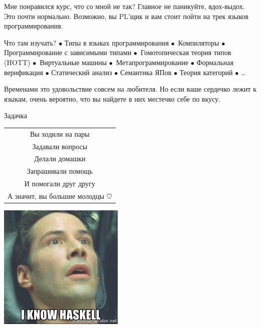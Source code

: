     \begin{frame}{Мне понравился курс, что со мной не так?}
        Главное не паникуйте, вдох-выдох. Это почти нормально. Возможно, вы PL'щик и вам стоит пойти на трек языков программирования.

        \vspace{1em}
        Что там изучать? $\bullet$ Типы в языках программирования $\bullet$~Компиляторы $\bullet$ Программирование с зависимыми типами $\bullet$~Гомотопическая теория типов (HOTT) $\bullet$~Виртуальные машины $\bullet$~Метапрограммирование $\bullet$ Формальная верификация $\bullet$ Статический анализ $\bullet$ Семантика ЯПов $\bullet$ Теория категорий $\bullet$ \ldots

        \vspace{1em}
        Временами это удовольствие совсем на любителя. Но если ваше сердечко лежит к языкам, очень вероятно, что вы найдете в них местечко себе по вкусу.
    \end{frame}

    \begin{frame}[fragile]{Задачка}
        \begin{center}
            \begin{tabular}{c}
                 Вы ходили на пары \\
                 Задавали вопросы \\
                 Делали домашки \\
                 Запрашивали помощь \\
                 И помогали друг другу \\
                \hline
                 А значит, вы большие молодцы $\heartsuit$
            \end{tabular}
        \end{center}
    \end{frame}

    \begin{frame}{}
        \vspace{2em}
        \pause
        \begin{center}
            \includegraphics[width=0.45\textwidth]{figs/iknowhaskell}
        \end{center}
    \end{frame}


